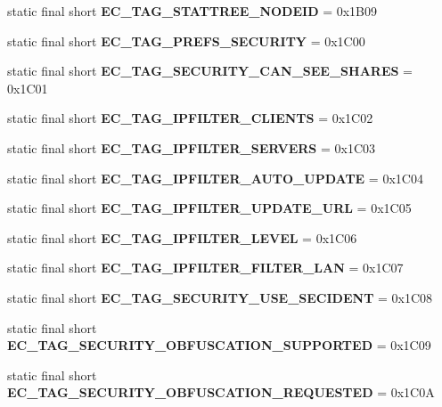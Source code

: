 \begin{DoxyCompactItemize}
\item 
static final short {\bfseries EC\_\-TAG\_\-STATTREE\_\-NODEID} = 0x1B09\label{interfaceECCodes_ac8fad02c6e4e617a85101fa62f93b5cb}

\item 
static final short {\bfseries EC\_\-TAG\_\-PREFS\_\-SECURITY} = 0x1C00\label{interfaceECCodes_a936b23da8d12ac9c77b071a438dacfab}

\item 
static final short {\bfseries EC\_\-TAG\_\-SECURITY\_\-CAN\_\-SEE\_\-SHARES} = 0x1C01\label{interfaceECCodes_a961cf7d3918391d296447e2c68fd0d4a}

\item 
static final short {\bfseries EC\_\-TAG\_\-IPFILTER\_\-CLIENTS} = 0x1C02\label{interfaceECCodes_ac6ad04bbe8846150d006c73ddc510c45}

\item 
static final short {\bfseries EC\_\-TAG\_\-IPFILTER\_\-SERVERS} = 0x1C03\label{interfaceECCodes_a3edbfb40dc94a61f87e9058e29d46f4f}

\item 
static final short {\bfseries EC\_\-TAG\_\-IPFILTER\_\-AUTO\_\-UPDATE} = 0x1C04\label{interfaceECCodes_a76ec1003c25661b1f34d356976170533}

\item 
static final short {\bfseries EC\_\-TAG\_\-IPFILTER\_\-UPDATE\_\-URL} = 0x1C05\label{interfaceECCodes_abe29a5da37a34e4e8e09c3ad13ff763f}

\item 
static final short {\bfseries EC\_\-TAG\_\-IPFILTER\_\-LEVEL} = 0x1C06\label{interfaceECCodes_a7cbb6c11fcbd7344cd1ab232ca5b460d}

\item 
static final short {\bfseries EC\_\-TAG\_\-IPFILTER\_\-FILTER\_\-LAN} = 0x1C07\label{interfaceECCodes_a8a47cf3ce5f3ac0213ee2504f5eee837}

\item 
static final short {\bfseries EC\_\-TAG\_\-SECURITY\_\-USE\_\-SECIDENT} = 0x1C08\label{interfaceECCodes_a342057bd49ed71a8e1ab3fd6488e496c}

\item 
static final short {\bfseries EC\_\-TAG\_\-SECURITY\_\-OBFUSCATION\_\-SUPPORTED} = 0x1C09\label{interfaceECCodes_a5a672fd5a54431f7dbe1aef857c45c87}

\item 
static final short {\bfseries EC\_\-TAG\_\-SECURITY\_\-OBFUSCATION\_\-REQUESTED} = 0x1C0A\label{interfaceECCodes_a155eba2963d52963033760cdc4ac51b9}


\end{DoxyCompactItemize}
